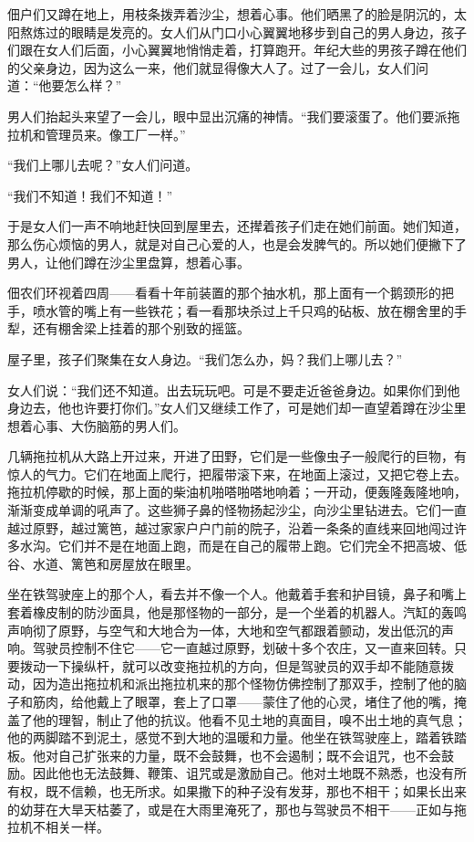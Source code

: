 \documentclass[12pt,UTF-8,openany]{ctexbook}
\begin{document}
    佃户们又蹲在地上，用枝条拨弄着沙尘，想着心事。他们晒黑了的脸是阴沉的，太阳熬炼过的眼睛是发亮的。女人们从门口小心翼翼地移步到自己的男人身边，孩子们跟在女人们后面，小心翼翼地悄悄走着，打算跑开。年纪大些的男孩子蹲在他们的父亲身边，因为这么一来，他们就显得像大人了。过了一会儿，女人们问道：“他要怎么样？”
    
    男人们抬起头来望了一会儿，眼中显出沉痛的神情。“我们要滚蛋了。他们要派拖拉机和管理员来。像工厂一样。”
    
    “我们上哪儿去呢？”女人们问道。
    
    “我们不知道！我们不知道！”
    
    于是女人们一声不响地赶快回到屋里去，还撵着孩子们走在她们前面。她们知道，那么伤心烦恼的男人，就是对自己心爱的人，也是会发脾气的。所以她们便撇下了男人，让他们蹲在沙尘里盘算，想着心事。
    
    佃农们环视着四周——看看十年前装置的那个抽水机，那上面有一个鹅颈形的把手，喷水管的嘴上有一些铁花；看一看那块杀过上千只鸡的砧板、放在棚舍里的手犁，还有棚舍梁上挂着的那个别致的摇篮。
    
    屋子里，孩子们聚集在女人身边。“我们怎么办，妈？我们上哪儿去？”
    
    女人们说：“我们还不知道。出去玩玩吧。可是不要走近爸爸身边。如果你们到他身边去，他也许要打你们。”女人们又继续工作了，可是她们却一直望着蹲在沙尘里想着心事、大伤脑筋的男人们。
    
    几辆拖拉机从大路上开过来，开进了田野，它们是一些像虫子一般爬行的巨物，有惊人的气力。它们在地面上爬行，把履带滚下来，在地面上滚过，又把它卷上去。拖拉机停歇的时候，那上面的柴油机啪嗒啪嗒地响着；一开动，便轰隆轰隆地响，渐渐变成单调的吼声了。这些狮子鼻的怪物扬起沙尘，向沙尘里钻进去。它们一直越过原野，越过篱笆，越过家家户户门前的院子，沿着一条条的直线来回地闯过许多水沟。它们并不是在地面上跑，而是在自己的履带上跑。它们完全不把高坡、低谷、水道、篱笆和房屋放在眼里。
    
    坐在铁驾驶座上的那个人，看去并不像一个人。他戴着手套和护目镜，鼻子和嘴上套着橡皮制的防沙面具，他是那怪物的一部分，是一个坐着的机器人。汽缸的轰鸣声响彻了原野，与空气和大地合为一体，大地和空气都跟着颤动，发出低沉的声响。驾驶员控制不住它——它一直越过原野，划破十多个农庄，又一直来回转。只要拨动一下操纵杆，就可以改变拖拉机的方向，但是驾驶员的双手却不能随意拨动，因为造出拖拉机和派出拖拉机来的那个怪物仿佛控制了那双手，控制了他的脑子和筋肉，给他戴上了眼罩，套上了口罩——蒙住了他的心灵，堵住了他的嘴，掩盖了他的理智，制止了他的抗议。他看不见土地的真面目，嗅不出土地的真气息；他的两脚踏不到泥土，感觉不到大地的温暖和力量。他坐在铁驾驶座上，踏着铁踏板。他对自己扩张来的力量，既不会鼓舞，也不会遏制；既不会诅咒，也不会鼓励。因此他也无法鼓舞、鞭策、诅咒或是激励自己。他对土地既不熟悉，也没有所有权，既不信赖，也无所求。如果撒下的种子没有发芽，那也不相干；如果长出来的幼芽在大旱天枯萎了，或是在大雨里淹死了，那也与驾驶员不相干——正如与拖拉机不相关一样。
    
\end{document}
